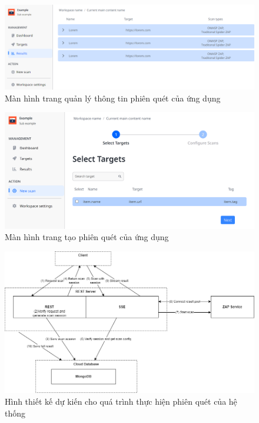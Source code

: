\begin{figure}[H]
    \centering
    \includegraphics[width=\textwidth]{images/prototype/prototype_25102022/dashboard_result.png}
    \caption{Màn hình trang quản lý thông tin phiên quét của ứng dụng}
\end{figure}

\begin{figure}[H]
    \centering
    \includegraphics[width=\textwidth]{images/prototype/prototype_22112022/dashboad_new scan_select target.png}
    \caption{Màn hình trang tạo phiên quét của ứng dụng}
\end{figure}

\newpage
{}
\begin{figure}[H]
    \centering
    \includegraphics[width=\textwidth]{images/diagram/diagram_04112023/Scan Process.png}
    \caption{Hình thiết kế dự kiến cho quá trình thực hiện phiên quét của hệ thống}
\end{figure}

